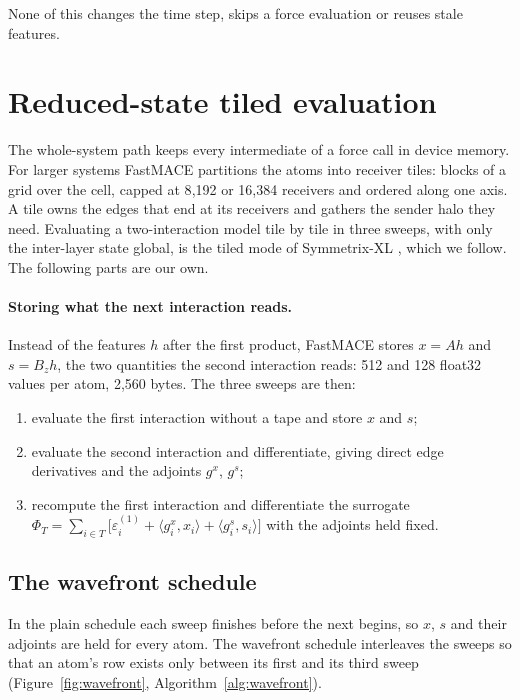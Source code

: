\documentclass[11pt]{article}
\begin{document}
None of this changes the time step, skips a force evaluation or reuses stale features.

\section{Reduced-state tiled evaluation}
\label{sec:tiled}

The whole-system path keeps every intermediate of a force call in device memory. For larger systems FastMACE
partitions the atoms into receiver tiles: blocks of a grid over the cell, capped at 8{,}192 or 16{,}384
receivers and ordered along one axis. A tile owns the edges that end at its receivers and gathers the sender
halo they need. Evaluating a two-interaction model tile by tile in three sweeps, with only the inter-layer state
global, is the tiled mode of Symmetrix-XL \cite{fu2026symmetrixxl}, which we follow. The following parts are our
own.

\paragraph{Storing what the next interaction reads.}
Instead of the features $h$ after the first product, FastMACE stores $x = A h$ and $s = B_z h$, the two
quantities the second interaction reads: 512 and 128 float32 values per atom, 2{,}560 bytes. The three sweeps
are then:
\begin{enumerate}\setlength{\itemsep}{0.1em}
\item evaluate the first interaction without a tape and store $x$ and $s$;
\item evaluate the second interaction and differentiate, giving direct edge derivatives and the adjoints
      $g^x$, $g^s$;
\item recompute the first interaction and differentiate the surrogate
      $\Phi_T = \sum_{i\in T}\bigl[\varepsilon^{(1)}_i + \langle g^x_i, x_i\rangle + \langle g^s_i, s_i\rangle\bigr]$
      with the adjoints held fixed.
\end{enumerate}

\subsection{The wavefront schedule}
\label{sec:wavefront}

In the plain schedule each sweep finishes before the next begins, so $x$, $s$ and their adjoints are held for
every atom. The wavefront schedule interleaves the sweeps so that an atom's row exists only between its first
and its third sweep (Figure~\ref{fig:wavefront}, Algorithm~\ref{alg:wavefront}).
\end{document}
